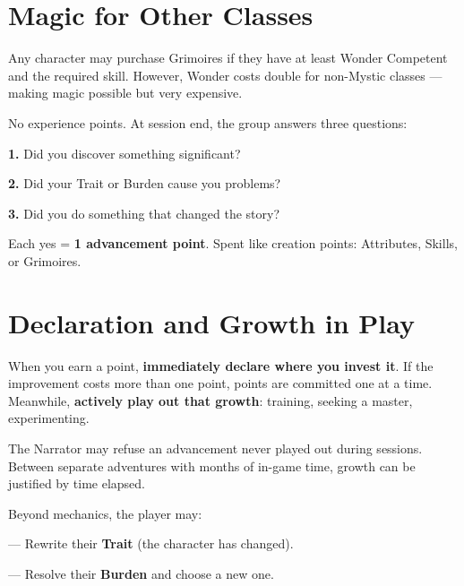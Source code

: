 \documentclass[10pt,a4paper]{article}
\begin{document}
\section*{Magic for Other Classes}

Any character may purchase Grimoires if they have at least Wonder Competent and the required skill. However, Wonder costs double for non-Mystic classes — making magic possible but very expensive.



No experience points. At session end, the group answers three questions:


\textbf{1.} Did you discover something significant?


\textbf{2.} Did your Trait or Burden cause you problems?


\textbf{3.} Did you do something that changed the story?


Each yes = \textbf{1 advancement point}. Spent like creation points: Attributes, Skills, or Grimoires.


\section*{Declaration and Growth in Play}

When you earn a point, \textbf{immediately declare where you invest it}. If the improvement costs more than one point, points are committed one at a time. Meanwhile, \textbf{actively play out that growth}: training, seeking a master, experimenting.


The Narrator may refuse an advancement never played out during sessions. Between separate adventures with months of in-game time, growth can be justified by time elapsed.


Beyond mechanics, the player may:


— Rewrite their \textbf{Trait} (the character has changed).


— Resolve their \textbf{Burden} and choose a new one.


\end{document}
